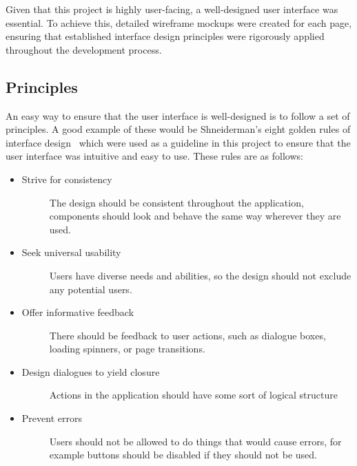 Given that this project is highly user-facing, a well-designed user interface was essential. To achieve this, detailed wireframe mockups were created for each page, ensuring that established interface design principles were rigorously applied throughout the development process.


\subsection{Principles}
An easy way to ensure that the user interface is well-designed is to follow a set of principles. A good example of these would be Shneiderman's eight golden rules of interface design~\cite{Shneiderman} which were used as a guideline in this project to ensure that the user interface was intuitive and easy to use. These rules are as follows:
\begin{itemize}
    \item Strive for consistency
    \begin{description}
        \item[] The design should be consistent throughout the application, components should look and behave the same way wherever they are used.
    \end{description}
    \item Seek universal usability
    \begin{description}
        \item[] Users have diverse needs and abilities, so the design should not exclude any potential users.
    \end{description}
    \item Offer informative feedback
    \begin{description}
        \item[] There should be feedback to user actions, such as dialogue boxes, loading spinners, or page transitions.
    \end{description}
    \item Design dialogues to yield closure
    \begin{description}
        \item[] Actions in the application should have some sort of logical structure
    \end{description}
    \item Prevent errors
    \begin{description}
        \item[] Users should not be allowed to do things that would cause errors, for example buttons should be disabled if they should not be used.

\end{description}
\end{itemize}
